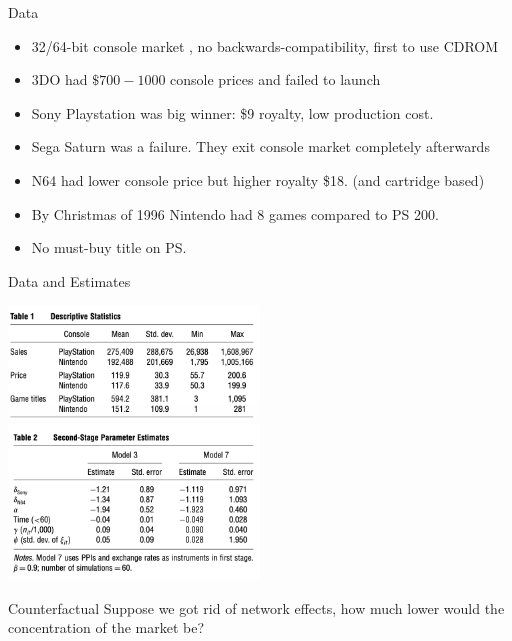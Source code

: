 \documentclass[aspectratio=169,11pt]{beamer}
\begin{document}
\begin{frame}{Data}
\begin{itemize}
\item 32/64-bit console market , no backwards-compatibility, first to use CDROM
\item 3DO had $\$700-1000$ console prices and failed to launch
\item Sony Playstation was big winner: \$9 royalty, low production cost.
\item Sega Saturn was a failure. They exit console market completely afterwards
\item N64 had lower console price but higher royalty \$18. (and cartridge based)
\item By Christmas of 1996 Nintendo had 8 games compared to PS 200.
\item No must-buy title on PS.
\end{itemize}
\end{frame}

\begin{frame}{Data and Estimates}
\begin{center}
\includegraphics[width=0.5\textwidth]{resources/dube-table1.png}
\includegraphics[width=0.5\textwidth]{resources/dube-table2.png}
\end{center}
\end{frame}

\begin{frame}{Counterfactual}
Suppose we got rid of network effects, how much lower would the concentration of the market be?
\end{frame}
\end{document}

